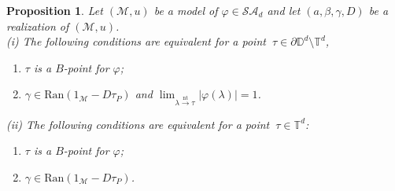\documentclass[11pt, reqno]{amsart}
\newtheorem{proposition}[theorem]{Proposition}
\newcommand\1{\boldsymbol {1}}
\newcommand{\nt}{\stackrel{\mathrm {nt}}{\to}}
\newcommand{\ph}{\varphi}
\newcommand\la{\lambda}
\numberwithin{equation}{section}
\begin{document}
\begin{proposition}\label{prop5.17cara}
Let $(\mathcal{M},u)$ be a model of $\varphi\in\mathcal{SA}_{d}$ and let $(a,\beta,\gamma,D)$ be a realization of $(\mathcal{M},u)$. \\
{\rm (i)} The following conditions are equivalent for a point $ \ \tau \in \partial \mathbb{D}^d \setminus \mathbb{T}^d$, 
\begin{enumerate}
\item  $\tau$ is a $B$-point for $\ph$;
\item $\gamma\in\mathrm{Ran}(1_{\mathcal{M}}-D\tau_{P})$ and
$ \lim_{\la \nt \tau} |\varphi(\lambda)| =1$. 
\end{enumerate}
{\rm (ii)} The following conditions are equivalent for a point  $ \ \tau \in  \mathbb{T}^d$:
\begin{enumerate}
\item  $\tau$ is a $B$-point for $\ph$;
\item $\gamma\in\mathrm{Ran}(1_{\mathcal{M}}-D\tau_{P})$.
\end{enumerate}
\end{proposition}
\end{document}
